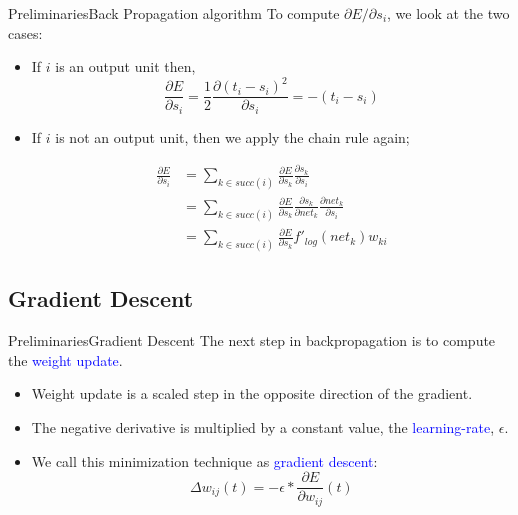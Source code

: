 \documentclass{beamer}
\begin{document}
\begin{frame}{Preliminaries}{Back Propagation algorithm}
To compute $ \partial E / \partial s_i $, we look at the two cases:

\pause
\begin{itemize}
\item If $ i $ is an output unit then, 
\begin{equation*}
\frac{\partial E}{\partial s_{i}}  = \frac{1}{2} \frac{\partial (t_{i} - s_{i})^2}{\partial s_{i}} = -(t_i - s_i)
\end{equation*}

\pause
\item If $ i $ is not an output unit, then we apply the chain rule again;

\begin{align*}
\frac{\partial E}{\partial s_{i}}  & = \sum_{k \in succ(i)} \frac{\partial E}{\partial s_{k}} \frac{\partial s_{k}}{\partial s_{i}} \\
 & = \sum_{k \in succ(i)} \frac{\partial E}{\partial s_{k}}  \frac{\partial s_k}{\partial {net_{k}}}  \frac{\partial {net_k}}{\partial s_{i}} \\
 &= \sum_{k \in succ(i)} \frac{\partial E}{\partial s_{k}} f'_{log} (net_k) w_{ki}
\end{align*}

\end{itemize} 
\end{frame}


\subsection{Gradient Descent}
\begin{frame}{Preliminaries}{Gradient Descent}
The next step in backpropagation is to compute the \textcolor{blue}{weight update}. 	 

\pause
\begin{itemize}
\item Weight update is a scaled step in the opposite direction of the gradient. 
\item The negative derivative is multiplied by a constant value, the \textcolor{blue}{learning-rate}, $ \epsilon $. 
\item We call this minimization technique as \textcolor{blue}{gradient descent}:
\begin{equation*}
\Delta w_{ij} (t) = - \epsilon * \frac{\partial E}{\partial w_{ij} } (t)
\end{equation*} 	
\end{itemize}		

\end{frame}
\end{document}
